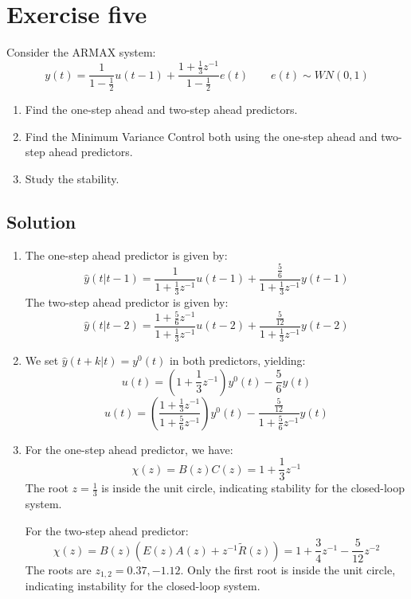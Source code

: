 \section{Exercise five}

Consider the ARMAX system: 
\[y(t)=\dfrac{1}{1-\frac{1}{2}}u(t-1)+\dfrac{1+\frac{1}{3}z^{-1}}{1-\frac{1}{2}}e(t) \qquad e(t)\sim WN(0,1)\]
\begin{enumerate}
    \item Find the one-step ahead and two-step ahead predictors.
    \item Find the Minimum Variance Control both using the one-step ahead and two-step ahead predictors.
    \item Study the stability.
\end{enumerate}

\subsection*{Solution}
\begin{enumerate}
    \item The one-step ahead predictor is given by:
        \[\hat{y}(t|t-1)=\dfrac{1}{1+\frac{1}{3}z^{-1}}u(t-1)+\dfrac{\frac{5}{6}}{1+\frac{1}{3}z^{-1}}y(t-1)\]
        The two-step ahead predictor is given by:
        \[\hat{y}(t|t-2)=\dfrac{1+\frac{5}{6}z^{-1}}{1+\frac{1}{3}z^{-1}}u(t-2)+\dfrac{\frac{5}{12}}{1+\frac{1}{3}z^{-1}}y(t-2)\]
    \item We set $\hat{y}(t+k|t)=y^0(t)$ in both predictors, yielding: 
        \[u(t)=\left(1+\frac{1}{3}z^{-1}\right)y^0(t)-\dfrac{5}{6}y(t)\]
        \[u(t)=\left(\dfrac{1+\frac{1}{3}z^{-1}}{1+\frac{5}{6}z^{-1}}\right)y^0(t)-\dfrac{\frac{5}{12}}{1+\frac{5}{6}z^{-1}}y(t)\]
    \item For the one-step ahead predictor, we have:
        \[\chi(z)=B(z)C(z)=1+\dfrac{1}{3}z^{-1}\]
        The root $z=\frac{1}{3}$ is inside the unit circle, indicating stability for the closed-loop system.

        For the two-step ahead predictor:
        \[\chi(z)=B(z)\left(E(z)A(z)+z^{-1}\tilde{R}(z)\right)=1+\dfrac{3}{4}z^{-1}-\dfrac{5}{12}z^{-2}\]
        The roots are $z_{1,2}=0.37,-1.12$. 
        Only the first root is inside the unit circle, indicating instability for the closed-loop system.
\end{enumerate}




